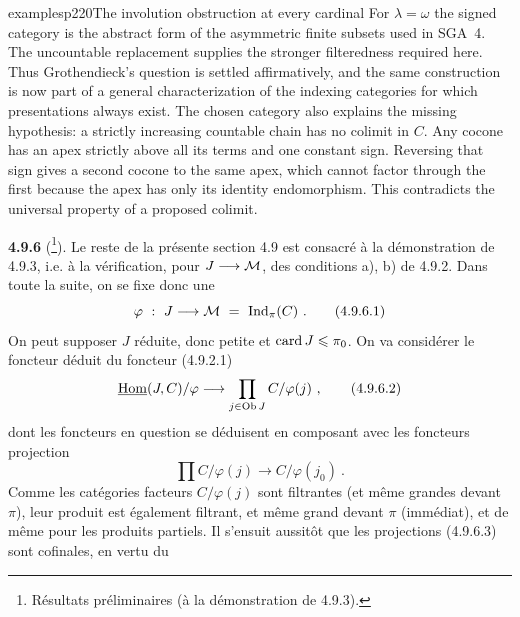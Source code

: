 \begin{dcomment}{examples}{p220}{The involution obstruction at every cardinal}
For $\lambda=\omega$ the signed category is the abstract form of the asymmetric finite subsets used in SGA~4.  The uncountable replacement supplies the stronger filteredness required here.  Thus Grothendieck's question is settled affirmatively, and the same construction is now part of a general characterization of the indexing categories for which presentations always exist.  The chosen category also explains the missing hypothesis: a strictly increasing countable chain has no colimit in $C$.  Any cocone has an apex strictly above all its terms and one constant sign.  Reversing that sign gives a second cocone to the same apex, which cannot factor through the first because the apex has only its identity endomorphism.  This contradicts the universal property of a proposed colimit.
\end{dcomment}



\textbf{4.9.6} (\footnote[96]{Résultats préliminaires (à la démonstration de 4.9.3).}). Le reste de la présente section 4.9 est consacré à la démonstration de 4.9.3, i.e. à la vérification, pour $J \longrightarrow \mathcal{M}$, des conditions a), b) de 4.9.2. Dans toute la suite, on se fixe donc une
\[
\varphi \ : \ J \longrightarrow \mathcal{M} \ = \ \mathrm{Ind}_\pi(C) \ . \tag*{(4.9.6.1)}
\]
On peut supposer $J$ réduite, donc petite et $\operatorname{card} J \leqslant \pi_0$. On va considérer le foncteur déduit du foncteur (4.9.2.1)
\[
\underline{\mathrm{Hom}}(J,C)/\varphi \longrightarrow \prod_{j \in \operatorname{Ob} J} C/\varphi(j) \ , \tag*{(4.9.6.2)}
\]
dont les foncteurs en question se déduisent en composant avec les foncteurs projection
\[
\prod C/\varphi(j) \longrightarrow C/\varphi(j_0) \ . \tag*{(4.9.6.3)}
\]
Comme les catégories facteurs $C/\varphi(j)$ sont filtrantes (et même grandes devant $\pi$), leur produit est également filtrant, et même grand devant $\pi$ (immédiat), et de même
pour les produits partiels. Il s'ensuit aussitôt que les projections (4.9.6.3) sont cofinales, en vertu du

